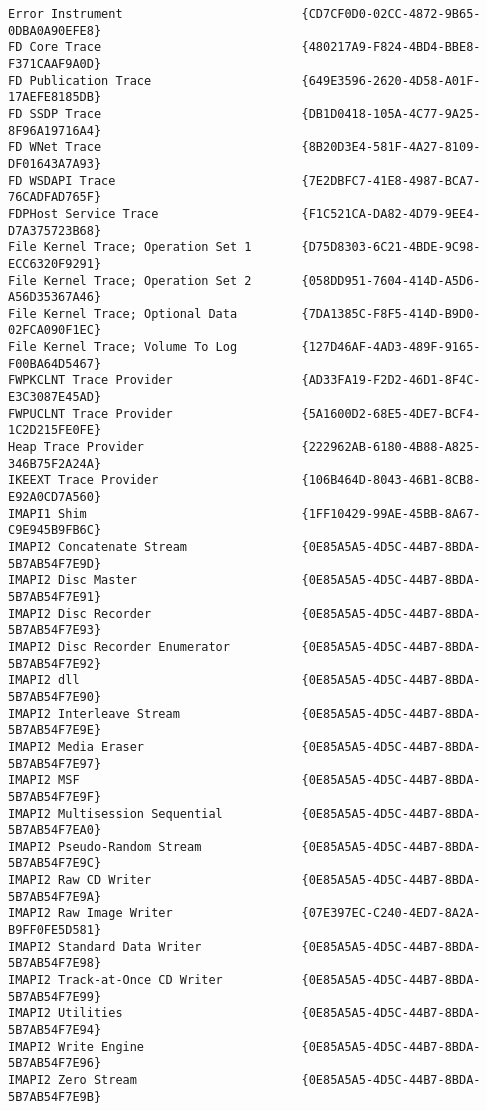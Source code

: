 \documentclass{report}
\begin{document}
\begin{lstlisting}[breaklines=true,basicstyle=\tiny]
Error Instrument                         {CD7CF0D0-02CC-4872-9B65-0DBA0A90EFE8}
FD Core Trace                            {480217A9-F824-4BD4-BBE8-F371CAAF9A0D}
FD Publication Trace                     {649E3596-2620-4D58-A01F-17AEFE8185DB}
FD SSDP Trace                            {DB1D0418-105A-4C77-9A25-8F96A19716A4}
FD WNet Trace                            {8B20D3E4-581F-4A27-8109-DF01643A7A93}
FD WSDAPI Trace                          {7E2DBFC7-41E8-4987-BCA7-76CADFAD765F}
FDPHost Service Trace                    {F1C521CA-DA82-4D79-9EE4-D7A375723B68}
File Kernel Trace; Operation Set 1       {D75D8303-6C21-4BDE-9C98-ECC6320F9291}
File Kernel Trace; Operation Set 2       {058DD951-7604-414D-A5D6-A56D35367A46}
File Kernel Trace; Optional Data         {7DA1385C-F8F5-414D-B9D0-02FCA090F1EC}
File Kernel Trace; Volume To Log         {127D46AF-4AD3-489F-9165-F00BA64D5467}
FWPKCLNT Trace Provider                  {AD33FA19-F2D2-46D1-8F4C-E3C3087E45AD}
FWPUCLNT Trace Provider                  {5A1600D2-68E5-4DE7-BCF4-1C2D215FE0FE}
Heap Trace Provider                      {222962AB-6180-4B88-A825-346B75F2A24A}
IKEEXT Trace Provider                    {106B464D-8043-46B1-8CB8-E92A0CD7A560}
IMAPI1 Shim                              {1FF10429-99AE-45BB-8A67-C9E945B9FB6C}
IMAPI2 Concatenate Stream                {0E85A5A5-4D5C-44B7-8BDA-5B7AB54F7E9D}
IMAPI2 Disc Master                       {0E85A5A5-4D5C-44B7-8BDA-5B7AB54F7E91}
IMAPI2 Disc Recorder                     {0E85A5A5-4D5C-44B7-8BDA-5B7AB54F7E93}
IMAPI2 Disc Recorder Enumerator          {0E85A5A5-4D5C-44B7-8BDA-5B7AB54F7E92}
IMAPI2 dll                               {0E85A5A5-4D5C-44B7-8BDA-5B7AB54F7E90}
IMAPI2 Interleave Stream                 {0E85A5A5-4D5C-44B7-8BDA-5B7AB54F7E9E}
IMAPI2 Media Eraser                      {0E85A5A5-4D5C-44B7-8BDA-5B7AB54F7E97}
IMAPI2 MSF                               {0E85A5A5-4D5C-44B7-8BDA-5B7AB54F7E9F}
IMAPI2 Multisession Sequential           {0E85A5A5-4D5C-44B7-8BDA-5B7AB54F7EA0}
IMAPI2 Pseudo-Random Stream              {0E85A5A5-4D5C-44B7-8BDA-5B7AB54F7E9C}
IMAPI2 Raw CD Writer                     {0E85A5A5-4D5C-44B7-8BDA-5B7AB54F7E9A}
IMAPI2 Raw Image Writer                  {07E397EC-C240-4ED7-8A2A-B9FF0FE5D581}
IMAPI2 Standard Data Writer              {0E85A5A5-4D5C-44B7-8BDA-5B7AB54F7E98}
IMAPI2 Track-at-Once CD Writer           {0E85A5A5-4D5C-44B7-8BDA-5B7AB54F7E99}
IMAPI2 Utilities                         {0E85A5A5-4D5C-44B7-8BDA-5B7AB54F7E94}
IMAPI2 Write Engine                      {0E85A5A5-4D5C-44B7-8BDA-5B7AB54F7E96}
IMAPI2 Zero Stream                       {0E85A5A5-4D5C-44B7-8BDA-5B7AB54F7E9B}

\end{lstlisting}
\end{document}
